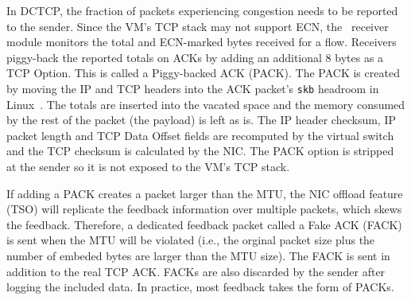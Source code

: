 In DCTCP, the fraction of packets experiencing congestion needs to be reported to the sender. 
Since the VM's TCP stack may not support ECN, the~\acdc{} receiver module monitors
the total and ECN-marked bytes received for a flow. Receivers piggy-back the
reported totals on ACKs by adding an additional 8 bytes as a TCP Option. This is called 
a Piggy-backed ACK (PACK). The PACK is created by moving the IP and TCP headers into
the ACK packet's {\tt skb} headroom in Linux~\cite{kernel-skb}. The totals are inserted into the vacated space and the memory
consumed by the rest of the packet (\ie{}the payload) is left as is. The IP header checksum, IP packet length and TCP Data Offset fields are recomputed by the virtual switch and the 
TCP checksum is calculated by the NIC. The PACK option is stripped at the
sender so it is not exposed to the VM's TCP stack. 

If adding a PACK creates a packet larger than the MTU, the NIC offload feature (\ie{}TSO)
will replicate the feedback information over multiple packets, which skews the feedback.
Therefore, a dedicated feedback packet called a Fake ACK (FACK) is sent when the MTU
will be violated (i.e., the orginal packet size plus the number of embeded bytes are larger than the MTU size). The FACK is sent in addition to the real TCP ACK.
FACKs are also discarded by the sender after logging the included
data. In practice, most feedback takes the form of PACKs.

